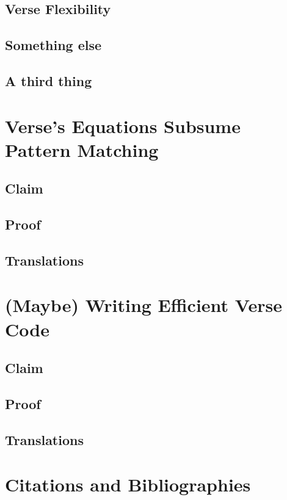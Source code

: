 \documentclass[manuscript,screen,review, 12pt]{acmart}
\begin{document}
\subsection{Verse Flexibility}
\subsection{Something else}
\subsection{A third thing}

\section{Verse's Equations Subsume Pattern Matching}

\subsection{Claim}
\subsection{Proof}
\subsection{Translations}

\section{(Maybe) Writing Efficient Verse Code}

\subsection{Claim}
\subsection{Proof}
\subsection{Translations}


\section{Citations and Bibliographies}
\end{document}
